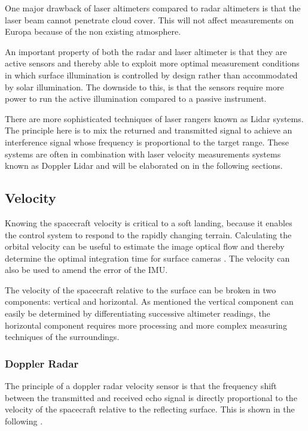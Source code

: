 One major drawback of laser altimeters compared to radar altimeters is that the laser beam cannot penetrate cloud cover. This will not affect measurements on Europa because of the non existing atmosphere. 

An important property of both the radar and laser altimeter is that they are active sensors and thereby able to exploit more optimal measurement conditions in which surface illumination is controlled by design rather than accommodated by  solar illumination. The downside to this, is that the sensors require more power to run the active illumination compared to a passive instrument. 

There are more sophisticated techniques of laser rangers known as Lidar systems. The principle here is to mix the returned and transmitted signal to achieve an interference signal whose frequency is proportional to the target range. These systems are often in combination with laser velocity measurements systems known as Doppler Lidar and will be elaborated on in the following sections. 



\subsection{Velocity}

Knowing the spacecraft velocity is critical to a soft landing, because it enables the control system to respond to the rapidly changing terrain. Calculating the orbital velocity can be useful to estimate the image optical flow and thereby determine the optimal integration time for surface cameras \cite{alessandro}. The velocity can also be used to amend the error of the IMU.

The velocity of the spacecraft relative to the surface can be broken in two components: vertical and horizontal. As mentioned the vertical component can easily be determined by differentiating successive altimeter readings, the horizontal component requires more processing and more complex measuring techniques of the surroundings. 

\subsubsection{Doppler Radar}
The principle of a doppler radar velocity sensor is that the frequency shift between the transmitted and received echo signal is directly proportional to the velocity of the spacecraft relative to the reflecting surface. This is shown in the following \cite{henningdoppler}. 

